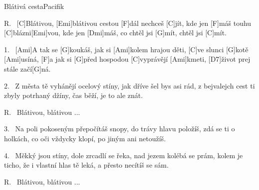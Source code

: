 \begin{song}{Blátivá cesta}{Pacifik}

\begin{xverse}{R.~}
[C]Blátivou, [Emi]blátivou cestou [F]dál nechceš [C]jít,
kde jen [F]máš touhu [C]blázni[Emi]vou,
kde jen [Dmi]máš, co chtěl jsi [G]mít, chtěl jsi [C]mít.
\end{xverse}

\begin{xverse}{1.~}
[Ami]A tak se [G]koukáš, jak si [Ami]kolem hrajou děti,
[C]ve slunci [G]kotě [Ami]usíná,
[F]a jak si [G]před hospodou [C]vyprávějí [Ami]kmeti,
[D7]{}život prej stále začí[G]ná.
\end{xverse}

\begin{xverse}{2.~}
Z města tě vyhánějí ocelový stíny,
jak dříve šel bys asi rád,
z bejvalejch cest ti zbyly potrhaný džíny,
čas běží, je to ale znát.
\end{xverse}

\begin{xverse}{R.~}
Blátivou, blátivou ...
\end{xverse}

\begin{xverse}{3.~}
Na poli pokoseným přepočítáš snopy,
do trávy hlavu položíš,
zdá se ti o holkách, co oči vždycky klopí,
po jiným ani netoužíš.
\end{xverse}

\begin{xverse}{4.~}
Měkký jsou stíny, dole zrcadlí se řeka,
nad jezem kolébá se prám,
kolem je ticho, že i vlastní hlas tě leká,
a přesto necítíš se sám.
\end{xverse}

\begin{xverse}{R.~}
Blátivou, blátivou ...
\end{xverse}

\end{song}

